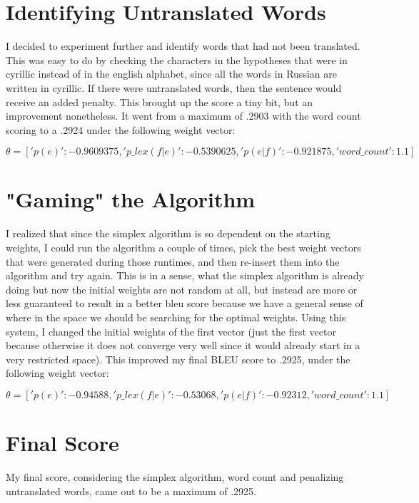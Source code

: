 \documentclass[11pt]{article}
\begin{document}
\section{Identifying Untranslated Words}
I decided to experiment further and identify words that had not been translated. This was easy to do by checking the characters in the hypotheses that were in cyrillic instead of in the english alphabet, since all the words in Russian are written in cyrillic. If there were untranslated words, then the sentence would receive an added penalty. This brought up the score a tiny bit, but an improvement nonetheless. It went from a maximum of .2903 with the word count scoring to a .2924 under the following weight vector: 
\begin{center}
$\theta =['p(e)': -0.9609375, 'p\_lex(f|e)': -0.5390625, 'p(e|f)': -0.921875, 'word\_count': 1.1]$
\end{center}
\section{"Gaming" the Algorithm}
I realized that since the simplex algorithm is so dependent on the starting weights, I could run the algorithm a couple of times, pick the best weight vectors that were generated during those runtimes, and then re-insert them into the algorithm and try again. This is in a sense, what the simplex algorithm is already doing but now the initial weights are not random at all, but instead are more or less guaranteed to result in a better bleu score because we have a general sense of where in the space we should be searching for the optimal weights. Using this system, I changed the initial weights of the first vector (just the first vector because otherwise it does not converge very well since it would already start in a very restricted space). This improved my final BLEU score to .2925, under the following weight vector:
\begin{center}
$\theta =['p(e)': -0.94588, 'p\_lex(f|e)': -0.53068, 'p(e|f)': -0.92312, 'word\_count': 1.1]$
\end{center}
\section{Final Score}
My final score, considering the simplex algorithm, word count and penalizing untranslated words, came out to be a maximum of .2925.
\end{document}
